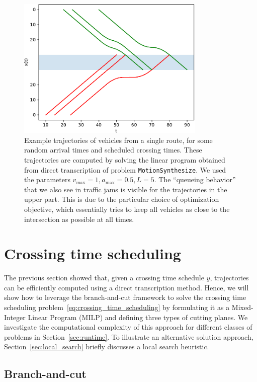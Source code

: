 \documentclass[a4paper]{article}
\theoremstyle{definition}
\theoremstyle{plain}
\begin{document}
\begin{figure}
  \centering
  \includegraphics[width=0.8\textwidth]{figures/single/trajectories_delay.pdf}
  \caption{Example trajectories of vehicles from a single route, for some random
    arrival times and scheduled crossing times. These trajectories are computed
    by solving the linear program obtained from direct transcription of problem
    \texttt{MotionSynthesize}. We used the parameters
    $v_{\max} = 1, a_{\max} = 0.5, L = 5$. The ``queueing behavior'' that we
    also see in traffic jams is visible for the trajectories in the upper part.
    This is due to the particular choice of optimization objective, which
    essentially tries to keep all vehicles as close to the intersection as
    possible at all times.}
\end{figure}


\section{Crossing time scheduling}
\label{sec:branch-and-cut}

The previous section showed that, given a crossing time schedule $y$,
trajectories can be efficiently computed using a direct transcription method.
Hence, we will show how to leverage the branch-and-cut framework to solve the
crossing time scheduling problem~\eqref{eq:crossing_time_scheduling} by formulating it as a Mixed-Integer Linear
Program (MILP) and defining three types of cutting planes. We investigate the
computational complexity of this approach for different classes of problems in
Section~\ref{sec:runtime}. To illustrate an alternative solution approach, Section~\ref{sec:local_search} briefly
discusses a local search heuristic.


\subsection{Branch-and-cut}
\end{document}
